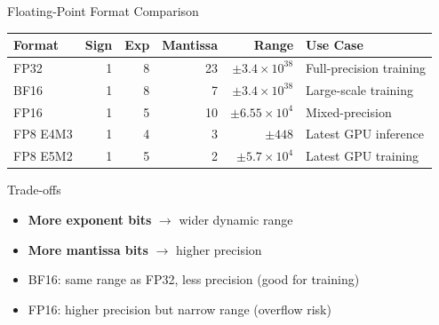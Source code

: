 \documentclass[aspectratio=169,10pt]{beamer}
\begin{document}
\begin{frame}{Floating-Point Format Comparison}
    \begin{table}
        \centering
        \small
        \begin{tabular}{lrrrrl}
            \toprule
            \textbf{Format} & \textbf{Sign} & \textbf{Exp} & \textbf{Mantissa} & \textbf{Range} & \textbf{Use Case} \\
            \midrule
            FP32 & 1 & 8 & 23 & $\pm 3.4 \times 10^{38}$ & Full-precision training \\
            BF16 & 1 & 8 & 7 & $\pm 3.4 \times 10^{38}$ & Large-scale training \\
            FP16 & 1 & 5 & 10 & $\pm 6.55 \times 10^{4}$ & Mixed-precision \\
            FP8 E4M3 & 1 & 4 & 3 & $\pm 448$ & Latest GPU inference \\
            FP8 E5M2 & 1 & 5 & 2 & $\pm 5.7 \times 10^{4}$ & Latest GPU training \\
            \bottomrule
        \end{tabular}
    \end{table}

    \vspace{0.5cm}
    \begin{block}{Trade-offs}
        \begin{itemize}
            \item \textbf{More exponent bits} $\to$ wider dynamic range
            \item \textbf{More mantissa bits} $\to$ higher precision
            \item BF16: same range as FP32, less precision (good for training)
            \item FP16: higher precision but narrow range (overflow risk)
        \end{itemize}
    \end{block}
\end{frame}
\end{document}
